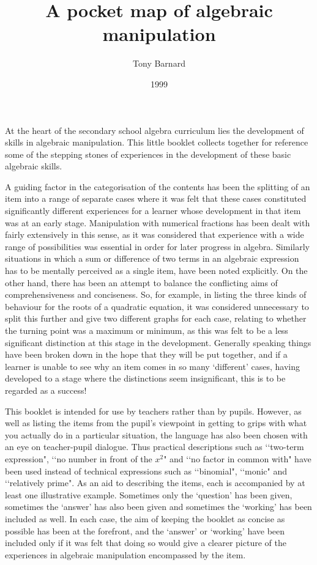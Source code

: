\documentclass{article}
\begin{document}
\title{A pocket map of algebraic manipulation}%
\author{Tony Barnard}%
\date{1999}%
\maketitle


At the heart of the secondary school algebra curriculum lies the development of skills in algebraic manipulation.  This little booklet collects together for reference some of the stepping stones of experiences in the development of these basic algebraic skills.

A guiding factor in the categorisation of the contents has been the splitting of an item into a range of separate cases where it was felt that these cases constituted significantly different experiences for a learner whose development in that item was at an early stage. Manipulation with numerical fractions has been dealt with fairly extensively in this sense, as it was considered that experience with a wide range of possibilities was essential in order for later progress in algebra.  Similarly situations in which a sum or difference of two terms in an algebraic expression has to be mentally perceived as a single item, have been noted explicitly.  On the other hand, there has been an attempt to balance the conflicting aims of comprehensiveness and conciseness.  So, for example, in listing the three kinds of behaviour for the roots of a quadratic equation, it was considered unnecessary to split this further and give two different graphs for each case, relating to whether the turning point was a maximum or minimum, as this was felt to be a less significant distinction at this stage in the development.  Generally speaking things have been broken down in the hope that they will be put together, and if a learner is unable to see why an item comes in so many \lq different' cases, having developed to a stage where the distinctions seem insignificant, this is to be regarded as a success!

This booklet is intended for use by teachers rather than by pupils.  However, as well as listing the items from the pupil's viewpoint in getting to grips with what you actually do in a particular situation, the language has also been chosen with an eye on teacher-pupil dialogue.  Thus practical descriptions such as \lq \lq two-term expression", \lq \lq no number in front of the \(x^2\)" and \lq \lq no factor in common with" have been used instead of technical expressions such as \lq \lq binomial", \lq \lq monic" and \lq \lq relatively prime".  As an aid to describing the items, each is accompanied by at least one illustrative example.  Sometimes only the \lq question' has been given, sometimes the \lq answer' has also been given and sometimes the \lq working' has been included as well.  In each case, the aim of keeping the booklet as concise as possible has been at the forefront, and the \lq answer' or \lq working' have been included only if it was felt that doing so would give a clearer picture of the experiences in algebraic manipulation encompassed by the item.
\end{document}
